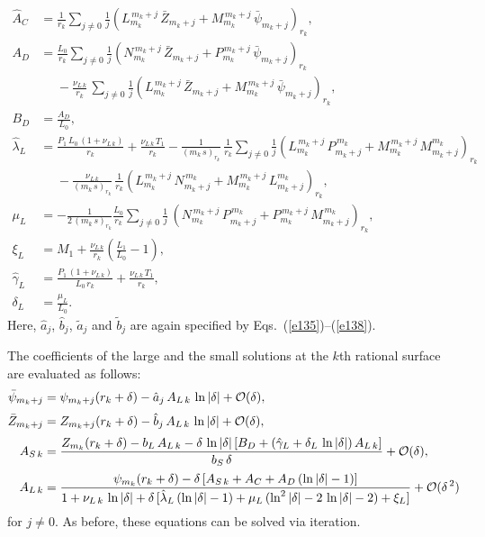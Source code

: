 \documentclass[12pt,prb,aps]{revtex4-1}
\begin{document}
\begin{align}
\hat{A}_{C} &= \frac{1}{r_k}\sum_{j\neq 0}\frac{1}{j}\left(L_{m_k}^{\,m_k+j}\,\bar{Z}_{m_k+j}+ M_{m_k}^{\,m_k+j}\,\bar{\psi}_{m_k+j}\right)_{r_k},\\[0.5ex]
A_{D} &=  \frac{L_0}{r_k}\sum_{j\neq 0}\frac{1}{j}\left(N_{m_k}^{\,m_k+j}\,\bar{Z}_{m_k+j}+ P_{m_k}^{\,m_k+j}\,\bar{\psi}_{m_k+j}\right)_{r_k}
\nonumber\\[0.5ex]&\phantom{=}-
\frac{\nu_{L\,k}}{r_k}\,\sum_{j\neq 0}\frac{1}{j}\left(L_{m_k}^{\,m_k+j}\,\bar{Z}_{m_k+j}+ M_{m_k}^{\,m_k+j}\,\bar{\psi}_{m_k+j}\right)_{r_k},
\\[0.5ex]
B_{D} &= \frac{A_{D}}{L_0},\\[0.5ex]
\hat{\lambda}_{L} &= \frac{P_1\,L_0\,(1+\nu_{L\,k}) }{r_k} + \frac{\nu_{L\,k}\,T_1}{r_k}
-\frac{1}{(m_k\,s)_{r_k}}\,\frac{1}{r_k}\sum_{j\neq 0}\frac{1}{j}\left(L_{m_k}^{\,m_k+j}\,P_{m_k+j}^{\,m_k}+M_{m_k}^{\,m_k+j}\,M_{m_k+j}^{m_k}\right)_{r_k}\nonumber\\[0.5ex]&\phantom{=}
- \frac{\nu_{L\,k}}{(m_k\,s)_{r_k}}\,\frac{1}{r_k}
\left(L_{m_k}^{\,m_k+j}\,N_{m_k+j}^{\,m_k}+M_{m_k}^{\,m_k+j}\,L_{m_k+j}^{m_k}\right)_{r_k},\\[0.5ex]
\mu_{L}&= -\frac{1}{2\,(m_k\,s)_{r_k}}\frac{L_0}{r_k}\sum_{j\neq 0}\frac{1}{j}\,(N_{m_k}^{\,m_k+j}\,P_{m_k+j}^{\,m_k}+P_{m_k}^{\,m_k+j}\,M_{m_k+j}^{\,m_k})_{r_k},\\[0.5ex]
\xi_{L} &= M_1+ \frac{\nu_{L\,k}}{r_k} \left(\frac{L_1}{L_0}-1\right),\\[0.5ex]
\hat{\gamma}_{L} &=\frac{P_1\,(1+\nu_{L\,k})}{L_0\,r_k} + \frac{\nu_{L\,k}\,T_1}{r_k},\\[0.5ex]
\delta_{L} &= \frac{\mu_{L}}{L_0}.
\end{align}
Here, $\hat{a}_j$, $\hat{b}_j$, $\tilde{a}_j$ and $\tilde{b}_j$ are again specified by Eqs.~(\ref{e135})--(\ref{e138}). 

The coefficients of the large and the small solutions at the $k$th rational surface are evaluated as follows:
\begin{align}
\bar{\psi}_{m_k+j} &= \psi_{m_k+j}(r_k+\delta)- \hat{a}_j\,A_{L\,k}\,\ln|\delta| +{\cal O}(\delta),\\[0.5ex]
\bar{Z}_{m_k+j}&= Z_{m_k+j}(r_k+\delta)-\hat{b}_j\,A_{L\,k}\,\ln|\delta|+{\cal O}(\delta),\\[0.5ex]
A_{S\,k} &= \frac{Z_{m_k}(r_k+\delta)-b_{L}\,A_{L\,k}-\delta\,\ln|\delta|\,[B_D+(\hat{\gamma}_L+\delta_L\,\ln|\delta|)\,A_{L\,k}]}
{b_S\,\delta}+{\cal O}(\delta),\\[0.5ex]
A_{L\,k} &= \frac{\psi_{m_k}(r_k+\delta)-\delta\,[A_{S\,k}+A_C+A_D\,(\ln|\delta|-1)]}
{1+\nu_{L\,k}\,\ln|\delta|+\delta\,[\hat{\lambda}_L\,(\ln|\delta|-1)+ \mu_L\,(\ln^2|\delta|-2\,\ln|\delta|-2)+\xi_L]}+{\cal O}(\delta^{\,2})
\end{align}
for $j\neq 0$. As before, these equations can be solved via iteration.
\end{document}
